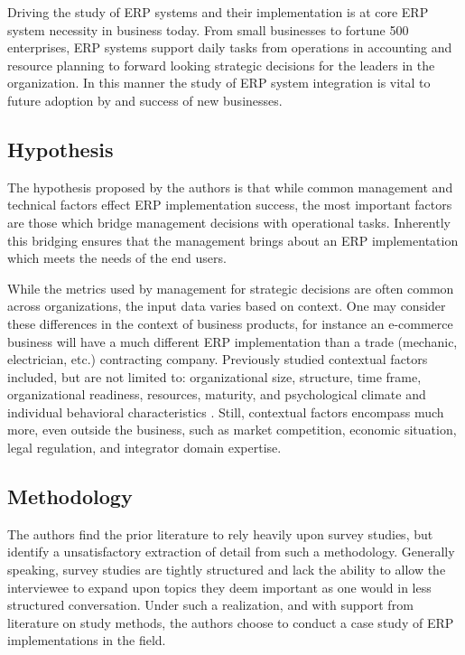 \documentclass{article}
\begin{document}
Driving the study of ERP systems and their implementation is at core ERP system necessity in business today.
From small businesses to fortune 500 enterprises, ERP systems support daily tasks from operations in accounting and resource planning to forward looking strategic decisions for the leaders in the organization.
In this manner the study of ERP system integration is vital to future adoption by and success of new businesses.

\subsection{Hypothesis}
The hypothesis proposed by the authors is that while common management and technical factors effect ERP implementation success, the most important factors are those which bridge management decisions with operational tasks.
Inherently this bridging ensures that the management brings about an ERP implementation which meets the needs of the end users.

While the metrics used by management for strategic decisions are often common across organizations, the input data varies based on context.
One may consider these differences in the context of business products, for instance an e-commerce business will have a much different ERP implementation than a trade (mechanic, electrician, etc.) contracting company.
Previously studied contextual factors included, but are not limited to: organizational size, structure, time frame, organizational readiness, resources, maturity, and psychological climate and individual behavioral characteristics \cite{integrated_erp}.
Still, contextual factors encompass much more, even outside the business, such as market competition, economic situation, legal regulation, and integrator domain expertise.

\subsection{Methodology}
The authors find the prior literature to rely heavily upon survey studies, but identify a unsatisfactory extraction of detail from such a methodology.
Generally speaking, survey studies are tightly structured and lack the ability to allow the interviewee to expand upon topics they deem important as one would in less structured conversation.
Under such a realization, and with support from literature on study methods, the authors choose to conduct a case study of ERP implementations in the field.
\end{document}

